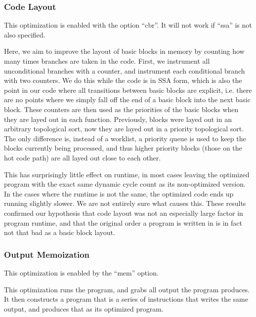 \documentclass[12pt,letterpaper]{article}
\begin{document}
\subsubsection*{Code Layout}

This optimization is enabled with the option ``cbr''. It will not work
if ``ssa'' is not also specified.

Here, we aim to improve the layout of basic blocks in memory by
counting how many times branches are taken in the code. First, we
instrument all unconditional branches with a counter, and instrument
each conditional branch with two counters. We do this while the code
is in SSA form, which is also the point in our code where all
transitions between basic blocks are explicit, i.e. there are no
points where we simply fall off the end of a basic block into the next
basic block. These counters are then used as the priorities of the
basic blocks when they are layed out in each function. Previously,
blocks were layed out in an arbitrary topological sort, now they are
layed out in a priority topological sort. The only difference is,
instead of a worklist, a priority queue is used to keep the blocks
currently being processed, and thus higher priority blocks (those on
the hot code path) are all layed out close to each other.

This has surprisingly little effect on runtime, in most cases leaving
the optimized program with the exact same dynamic cycle count as its
non-optimized version. In the cases where the runtime is not the same,
the optimized code ends up running slightly slower. We are not
entirely sure what causes this. These results confirmed our hypothesis
that code layout was not an especially large factor in program
runtime, and that the original order a program is written in is in
fact not that bad as a basic block layout.


\subsubsection*{Output Memoization}

This optimization is enabled by the ``mem'' option.

This optimization runs the program, and grabs all output the program
produces. It then constructs a program that is a series of
instructions that writes the same output, and produces that as its
optimized program.
\end{document}
